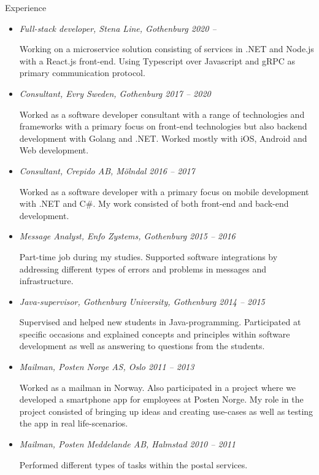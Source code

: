 {\itshape\Large\begin{center}
Experience
\end{center}}

\vspace{12px}

\begin{itemize}
  \item {\itshape Full-stack developer, Stena Line, Gothenburg 2020 –}

  Working on a microservice solution consisting of services in .NET and Node.js with a React.js front-end.
  Using Typescript over Javascript and gRPC as primary communication protocol.

  \item {\itshape Consultant, Evry Sweden, Gothenburg 2017 – 2020}

  Worked as a software developer consultant with a range of technologies and
  frameworks with a primary focus on front-end technologies but also backend development with Golang and .NET.
  Worked mostly with iOS, Android and Web development.

  \item {\itshape Consultant, Crepido AB, Mölndal 2016 – 2017}

  Worked as a software developer with a primary focus on mobile development with
  .NET and C\#. My work consisted of both front-end and back-end development.

  \item {\itshape Message Analyst, Enfo Zystems, Gothenburg 2015 – 2016}

  Part-time job during my studies. Supported software integrations by addressing
  different types of errors and problems in messages and infrastructure.

  \item {\itshape Java-supervisor, Gothenburg University, Gothenburg 2014 – 2015}

  Supervised and helped new students in Java-programming. Participated at specific
  occasions and explained concepts and principles within software development as
  well as answering to questions from the students.

  \item {\itshape Mailman, Posten Norge AS, Oslo 2011 – 2013}

  Worked as a mailman in Norway. Also participated in a project where we developed
  a smartphone app for employees at Posten Norge. My role in the project consisted
  of bringing up ideas and creating use-cases as well as testing the app in real life-scenarios.

  \item {\itshape Mailman, Posten Meddelande AB, Halmstad 2010 – 2011}

  Performed different types of tasks within the postal services.

\end{itemize}

